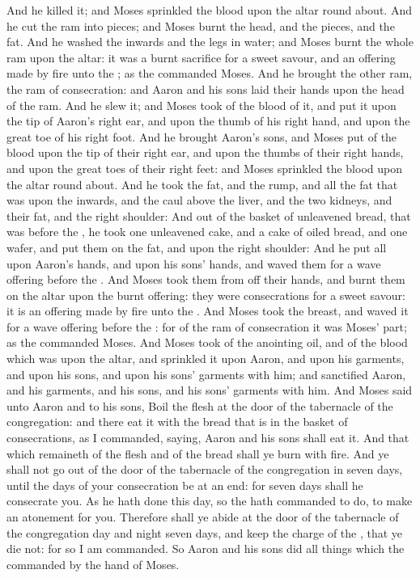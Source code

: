 \begin{biblechapter}
\verse And he killed it; and Moses sprinkled the blood upon the altar round about.
\verse And he cut the ram into pieces; and Moses burnt the head, and the pieces, and the fat.
\verse And he washed the inwards and the legs in water; and Moses burnt the whole ram upon the altar: it was a burnt sacrifice for a sweet savour, and an offering made by fire unto the \LORD; as the \LORD commanded Moses.
\verse And he brought the other ram, the ram of consecration: and Aaron and his sons laid their hands upon the head of the ram.
\verse And he slew it; and Moses took of the blood of it, and put it upon the tip of Aaron's right ear, and upon the thumb of his right hand, and upon the great toe of his right foot.
\verse And he brought Aaron's sons, and Moses put of the blood upon the tip of their right ear, and upon the thumbs of their right hands, and upon the great toes of their right feet: and Moses sprinkled the blood upon the altar round about.
\verse And he took the fat, and the rump, and all the fat that was upon the inwards, and the caul above the liver, and the two kidneys, and their fat, and the right shoulder:
\verse And out of the basket of unleavened bread, that was before the \LORD, he took one unleavened cake, and a cake of oiled bread, and one wafer, and put them on the fat, and upon the right shoulder:
\verse And he put all upon Aaron's hands, and upon his sons' hands, and waved them for a wave offering before the \LORD.
\verse And Moses took them from off their hands, and burnt them on the altar upon the burnt offering: they were consecrations for a sweet savour: it is an offering made by fire unto the \LORD.
\verse And Moses took the breast, and waved it for a wave offering before the \LORD: for of the ram of consecration it was Moses' part; as the \LORD commanded Moses.
\verse And Moses took of the anointing oil, and of the blood which was upon the altar, and sprinkled it upon Aaron, and upon his garments, and upon his sons, and upon his sons' garments with him; and sanctified Aaron, and his garments, and his sons, and his sons' garments with him.
\verse And Moses said unto Aaron and to his sons, Boil the flesh at the door of the tabernacle of the congregation: and there eat it with the bread that is in the basket of consecrations, as I commanded, saying, Aaron and his sons shall eat it.
\verse And that which remaineth of the flesh and of the bread shall ye burn with fire.
\verse And ye shall not go out of the door of the tabernacle of the congregation in seven days, until the days of your consecration be at an end: for seven days shall he consecrate you.
\verse As he hath done this day, so the \LORD hath commanded to do, to make an atonement for you.
\verse Therefore shall ye abide at the door of the tabernacle of the congregation day and night seven days, and keep the charge of the \LORD, that ye die not: for so I am commanded.
\verse So Aaron and his sons did all things which the \LORD commanded by the hand of Moses.
\end{biblechapter}

